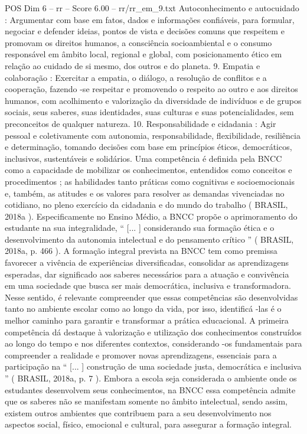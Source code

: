 \begin{textsample}{POS Dim 6 – rr – Score 6.00 – rr/rr\_em\_9.txt}
Autoconhecimento e autocuidado : Argumentar com base em fatos, dados e informações confiáveis, para formular, negociar e defender ideias, pontos de vista e decisões comuns que respeitem e promovam os direitos humanos, a consciência socioambiental e o consumo responsável em âmbito local, regional e global, com posicionamento ético em relação ao cuidado de si mesmo, dos outros e do planeta. 9.
Empatia e colaboração : Exercitar a empatia, o diálogo, a resolução de conflitos e a cooperação, fazendo -se respeitar e promovendo o respeito ao outro e aos direitos humanos, com acolhimento e valorização da diversidade de indivíduos e de grupos sociais, seus saberes, suas identidades, suas culturas e suas potencialidades, sem preconceitos de qualquer natureza. 10.
Responsabilidade e cidadania : Agir pessoal e coletivamente com autonomia, responsabilidade, flexibilidade, resiliência e determinação, tomando decisões com base em princípios éticos, democráticos, inclusivos, sustentáveis e solidários.
Uma competência é definida pela BNCC como a capacidade de mobilizar os conhecimentos, entendidos como conceitos e procedimentos ; as habilidades tanto práticas como cognitivas e socioemocionais e, também, as atitudes e os valores para resolver as demandas vivenciadas no cotidiano, no pleno exercício da cidadania e do mundo do trabalho ( BRASIL, 2018a ).
Especificamente no Ensino Médio, a BNCC propõe o aprimoramento do estudante na sua integralidade, “ [... ] considerando sua formação ética e o desenvolvimento da autonomia intelectual e do pensamento crítico ” ( BRASIL, 2018a, p. 466 ).
A formação integral prevista na BNCC tem como premissa favorecer a vivência de experiências diversificadas, consolidar as aprendizagens esperadas, dar significado aos saberes necessários para a atuação e convivência em uma sociedade que busca ser mais democrática, inclusiva e transformadora.
Nesse sentido, é relevante compreender que essas competências são desenvolvidas tanto no ambiente escolar como ao longo da vida, por isso, identificá -las é o melhor caminho para garantir e transformar a prática educacional.
A primeira competência dá destaque à valorização e utilização dos conhecimentos construídos ao longo do tempo e nos diferentes contextos, considerando -os fundamentais para compreender a realidade e promover novas aprendizagens, essenciais para a participação na “ [... ] construção de uma sociedade justa, democrática e inclusiva ” ( BRASIL, 2018a, p. 7 ).
Embora a escola seja considerada o ambiente onde os estudantes desenvolvem seus conhecimentos, na BNCC essa competência admite que os saberes não se manifestam somente no âmbito intelectual, sendo assim, existem outros ambientes que contribuem para a seu desenvolvimento nos aspectos social, físico, emocional e cultural, para assegurar a formação integral.

\end{textsample}
